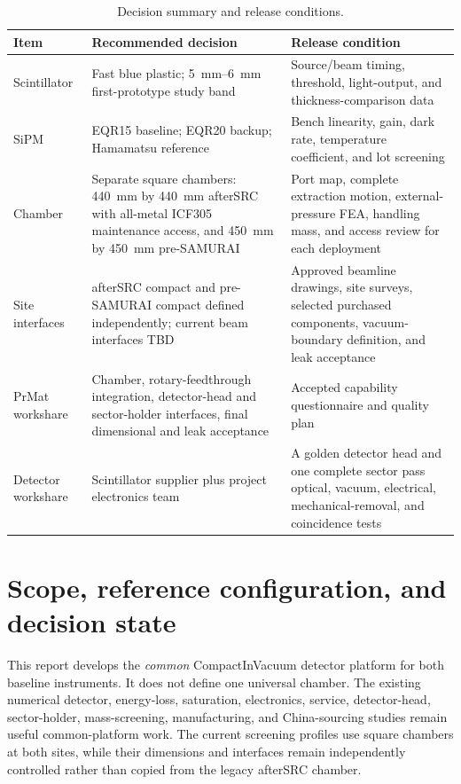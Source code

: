 \documentclass[10pt,letterpaper]{article}
\begin{document}
\begin{table}[htbp]
  \centering
  \small
  \caption{Decision summary and release conditions.}
  \begin{tabularx}{\textwidth}{L{0.18\textwidth}Y Y}
    \toprule
    Item & Recommended decision & Release condition \\
    \midrule
    Scintillator & Fast blue plastic; \SIrange{5}{6}{\milli\meter} first-prototype study band &
      Source/beam timing, threshold, light-output, and thickness-comparison data \\
    SiPM & EQR15 baseline; EQR20 backup; Hamamatsu reference &
      Bench linearity, gain, dark rate, temperature coefficient, and lot screening \\
    Chamber & Separate square chambers: \SI{440}{\milli\meter} by
      \SI{440}{\milli\meter} afterSRC with all-metal ICF305 maintenance access, and
      \SI{450}{\milli\meter} by \SI{450}{\milli\meter} pre-SAMURAI & Port map,
      complete extraction motion, external-pressure FEA, handling mass, and access review
      for each deployment \\
    Site interfaces & afterSRC compact and pre-SAMURAI compact defined independently; current
      beam interfaces TBD & Approved beamline drawings, site surveys, selected purchased
      components, vacuum-boundary definition, and leak acceptance \\
    PrMat workshare & Chamber, rotary-feedthrough integration, detector-head and
      sector-holder interfaces, final
      dimensional and leak acceptance & Accepted capability questionnaire and quality plan \\
    Detector workshare & Scintillator supplier plus project electronics team &
      A golden detector head and one complete sector pass optical, vacuum, electrical,
      mechanical-removal, and coincidence tests \\
    \bottomrule
  \end{tabularx}
\end{table}

\section{Scope, reference configuration, and decision state}

This report develops the \emph{common} CompactInVacuum detector platform for both baseline
instruments. It does not define one universal chamber. The existing numerical detector,
energy-loss, saturation, electronics, service, detector-head, sector-holder, mass-screening,
manufacturing, and China-sourcing studies remain useful common-platform work. The current
screening profiles use square chambers at both sites, while their dimensions and interfaces
remain independently controlled rather than copied from the legacy afterSRC chamber.
\end{document}
